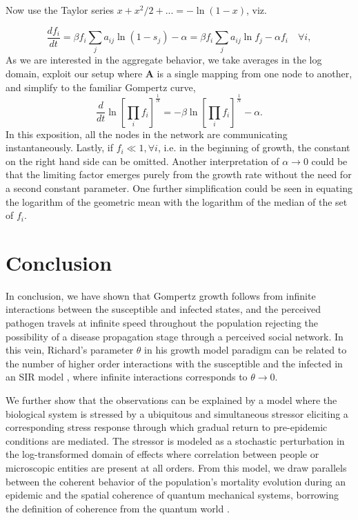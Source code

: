 \documentclass[review]{elsarticle}
\begin{document}
Now use the Taylor series $x+x^2/2+... = -\ln(1-x)$, viz.

\begin{equation}
\frac{d f_i}{dt} = \beta f_i\sum_j{a_{ij}}\ln{(1 - s_{j})} - \alpha = \beta f_i\sum_j{a_{ij}}\ln{f_{j}} - \alpha f_i \quad \forall i,
\end{equation}
As we are interested in the aggregate behavior, we take averages in the log domain, exploit our setup where $\mathbf{A}$ is a single mapping from one node to another, and simplify to the familiar Gompertz curve,
\begin{equation}
\frac{d}{{dt}} \ln\left[\prod_i{f_i}\right]^{\frac{1}{N}} = -\beta\ln\left[\prod_i{f_i}\right]^{\frac{1}{N}} - \alpha.
\end{equation}
In this exposition, all the nodes in the network are communicating instantaneously. Lastly, if $f_i \ll 1, \forall i$, i.e. in the beginning of growth, the constant on the right hand side can be omitted. Another interpretation of $\alpha\rightarrow 0$ could be that the limiting factor emerges purely from the growth rate without the need for a second constant parameter. One further simplification could be seen in equating the logarithm of the geometric mean with the logarithm of the median of the set of $f_i$.


\section{Conclusion}
In conclusion, we have shown that Gompertz growth follows from infinite interactions between the susceptible and infected states, and the perceived pathogen travels at infinite speed throughout the population rejecting the possibility of a disease propagation stage through a perceived social network. In this vein, Richard's parameter $\theta$ in his growth model paradigm can be related to the number of higher order interactions with the susceptible and the infected in an SIR model \citep{richards1959flexible}, where infinite interactions corresponds to $\theta\rightarrow 0$. 

We further show that the observations can be explained by a model where the biological system is stressed by a ubiquitous and simultaneous stressor eliciting a corresponding stress response through which gradual return to pre-epidemic conditions are mediated. The stressor is modeled as a stochastic perturbation in the log-transformed domain of effects where correlation between people or microscopic entities are present at all orders. From this model, we draw parallels between the coherent behavior of the population's mortality evolution during an epidemic and the spatial coherence of quantum mechanical systems, borrowing the definition of coherence from the quantum world \citep{molski2003coherent}.
\end{document}
